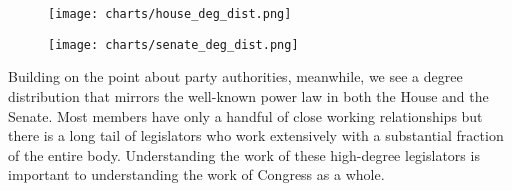 \begin{figure}[htbp]
  \centering
  \begin{minipage}[h]{0.4\textwidth}
    \texttt{[image: charts/house\_deg\_dist.png]}
  \end{minipage}
  \hfill
  \begin{minipage}[h]{0.4\textwidth}
    \texttt{[image: charts/senate\_deg\_dist.png]}
  \end{minipage}
\end{figure}

Building on the point about party authorities, meanwhile, we see a degree distribution that mirrors the well-known power law in both the House and the Senate. Most members have only a handful of close working relationships but there is a long tail of legislators who work extensively with a substantial fraction of the entire body. Understanding the work of these high-degree legislators is important to understanding the work of Congress as a whole.